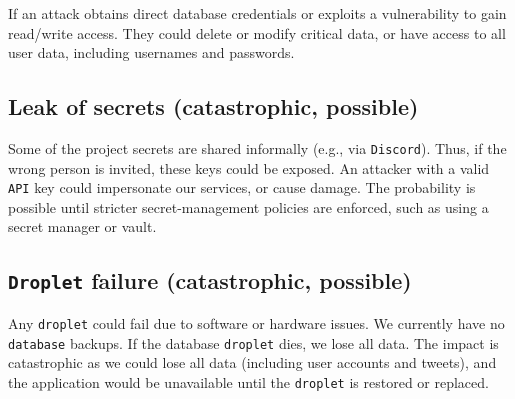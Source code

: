 If an attack obtains direct database credentials or exploits a 
vulnerability to gain read/write access. They could delete or modify 
critical data, or have access to all user data, including usernames 
and passwords.

\subsection{Leak of secrets (catastrophic, possible)}

Some of the project secrets are shared informally (e.g., via \texttt{Discord}). 
Thus, if the wrong person is invited, these keys could be exposed. 
An attacker with a valid \texttt{API} key could impersonate our services, 
or cause damage. The probability is possible until stricter 
secret-management policies are enforced, 
such as using a secret manager or vault.

\subsection{\texttt{Droplet} failure (catastrophic, possible)}
Any \texttt{droplet} could fail due to software or hardware issues. We currently have 
no \texttt{database} backups. If the database \texttt{droplet} dies, we lose all data. 
The impact is catastrophic as we could lose all data (including user accounts 
and tweets), and the application would be unavailable until the \texttt{droplet} is 
restored or replaced.